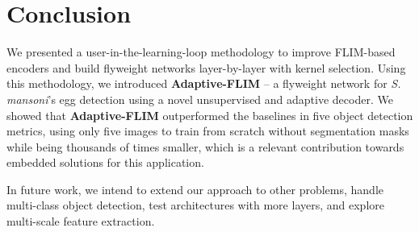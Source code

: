 \documentclass[times,twocolumn,final,authoryear]{elsarticle}
\begin{document}
\begin{table}[htb]
 \centering
    \caption{Comparison among the number of parameters of different models. The deep models presented are used in our comparisons, and the lightweight models are standard backbones used for object detection. Adaptive-FLIM* is our model without manual kernel selection}
    \label{tab:model-sizes}
\end{table}

\section{Conclusion}\label{sec:conclusion}
    We presented a user-in-the-learning-loop methodology to improve FLIM-based encoders and build flyweight networks layer-by-layer with kernel selection. Using this methodology, we introduced \textbf{Adaptive-FLIM} -- a flyweight network for \textit{S. mansoni}'s egg detection using a novel unsupervised and adaptive decoder. We showed that \textbf{Adaptive-FLIM} outperformed the baselines in five object detection metrics, using only five images to train from scratch without segmentation masks while being thousands of times smaller, which is a relevant contribution towards embedded solutions for this application.  
    
    In future work, we intend to extend our approach to other problems, handle multi-class object detection, test architectures with more layers, and explore multi-scale feature extraction.




\end{document}
